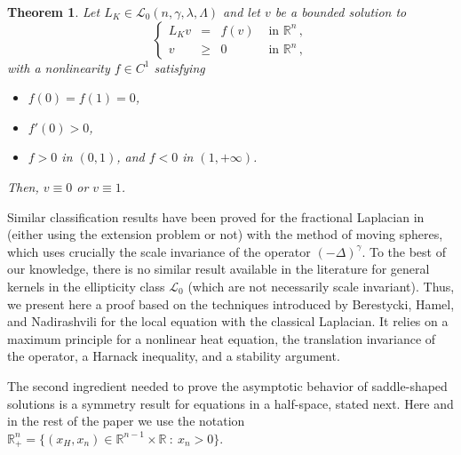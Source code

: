 \documentclass[12pt,reqno]{amsart}
\newtheorem{theorem}{Theorem}[section]
\theoremstyle{definition}
\theoremstyle{remark}
\newcommand{\con}[1]{\mathbb{#1}}
\newcommand{\R}{\con{R}} %
\newcommand{\lcal}{\mathcal{L}}
\newcommand{\s}{\gamma}
\newcommand{\fraclaplacian}{(-\Delta)^\s}
\newcommand\beqc[1]{\left\{\begin{array}{#1}}
\newcommand\eeqc{\end{array} \right.}
\def\PDEsystem{rcll}
\numberwithin{equation}{section}
\begin{document}
\begin{theorem}
	\label{Th:LiouvilleSemilinearWholeSpace}
	Let $L_K \in \lcal_0(n,\s,\lambda, \Lambda)$ and let $v$ be a bounded solution to
	\begin{equation}
	\label{Eq:PositiveWholeSpace}
	\beqc{\PDEsystem}
	L_K v &=& f(v) & \textrm{ in }\R^n\,,\\
	v &\geq& 0 & \textrm{ in } \R^n\,,
	\eeqc
	\end{equation}
	with a nonlinearity $f\in C^1$ satisfying
	\begin{itemize}
		\item $f(0) = f(1) = 0$,
		\item $f'(0)>0$,
		\item $f>0$ in $(0,1)$, and $f<0$ in $(1,+\infty)$.
	\end{itemize}
	Then, $v\equiv 0$ or $v \equiv 1$.
\end{theorem}

Similar classification results have been proved for the fractional Laplacian in \cite{ChenLiZhang,LiZhang} (either using the extension problem or not) with the method of moving spheres, which uses crucially the scale invariance of the operator $\fraclaplacian$. To the best of our knowledge, there is no similar result available in the literature for general kernels in the ellipticity class $\lcal_0$ (which are not necessarily scale invariant). Thus, we present here a proof based on the techniques introduced by Berestycki, Hamel, and Nadirashvili \cite{BerestyckiHamelNadi} for the local equation with the classical Laplacian. It relies on a maximum principle for a nonlinear heat equation, the translation invariance of the operator, a Harnack inequality, and a stability argument.

The second ingredient needed to prove the asymptotic behavior of saddle-shaped solutions is a symmetry result for equations in a half-space, stated next. Here and in the rest of the paper we use the notation $\R^n_+= \{(x_H,x_n)\in \R^{n-1}\times \R \ : \ x_n > 0\}$.  
\end{document}
